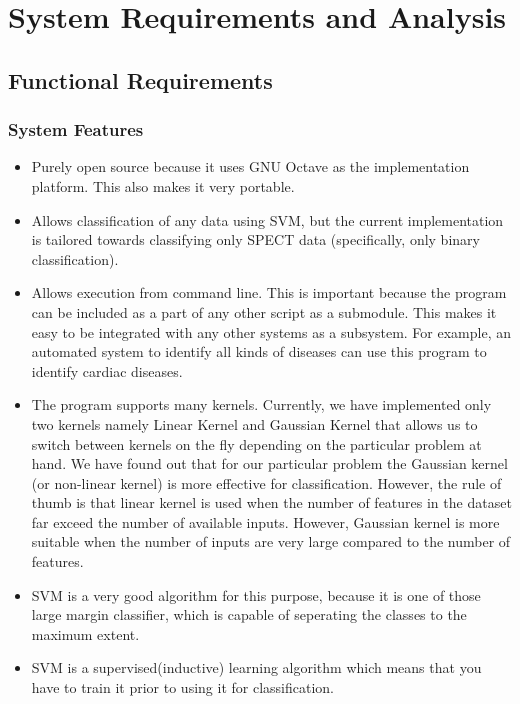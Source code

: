 \documentclass[11pt,a4paper]{report}
\begin{document}
{%





\chapter{System Requirements and Analysis}

\section{Functional Requirements}
\subsection{System Features}
\begin{itemize}
\item Purely open source because it uses GNU Octave as the implementation platform. This also makes it very portable.\\
\item Allows classification of any data using SVM, but the current implementation is tailored towards classifying only SPECT data (specifically, only binary classification).\\
\item Allows execution from command line. This is important because the program can be included as a part of any other script as a submodule. This makes it easy to be integrated with any other systems as a subsystem. For example, an automated system to identify all kinds of diseases can use this program to identify cardiac diseases.\\
\item The program supports many kernels. Currently, we have implemented only two kernels namely Linear Kernel and Gaussian Kernel that allows us to switch between kernels on the fly depending on the particular problem at hand. We have found out that for our particular problem the Gaussian kernel (or non-linear kernel) is more effective for classification. However, the rule of thumb is that linear kernel is used when the number of features in the dataset far exceed the number of available inputs. However, Gaussian kernel is more suitable when the number of inputs are very large compared to the number of features.\\
\item SVM is a very good algorithm for this purpose, because it is one of those large margin classifier, which is capable of seperating the classes to the maximum extent.\\
\item SVM is a supervised(inductive) learning algorithm which means that you have to train it prior to using it for classification.\\
\end{itemize}

}
\end{document}
